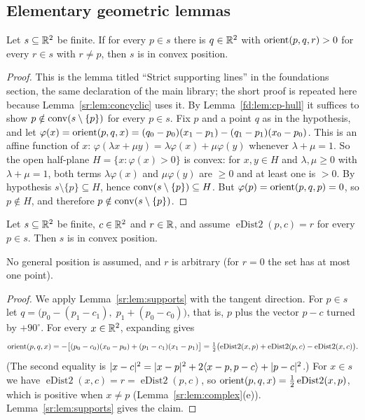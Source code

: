 \subsection{Elementary geometric lemmas}\label{sr:ssec:geom}

\begin{lemma}\label{sr:lem:supports}
Let $s\subseteq\mathbb R^2$ be finite. If for every $p\in s$ there is $q\in\mathbb R^2$ with $\operatorname{orient}(p,q,r)>0$ for every $r\in s$
with $r\ne p$, then $s$ is in convex position.
\end{lemma}

\begin{proof}
This is the lemma titled ``Strict supporting lines'' in the foundations section, the same declaration of the main
library; the short proof is repeated here because Lemma~\ref{sr:lem:concyclic} uses it. By Lemma~\ref{fd:lem:cp-hull} it
suffices to show $p\notin\operatorname{conv}(s\setminus\{p\})$ for every $p\in s$. Fix $p$ and a point $q$ as in the hypothesis, and
let $\varphi(x)=\operatorname{orient}(p,q,x)=(q_0-p_0)(x_1-p_1)-(q_1-p_1)(x_0-p_0)$. This is an affine function of $x$:
$\varphi(\lambda x+\mu y)=\lambda\varphi(x)+\mu\varphi(y)$ whenever $\lambda+\mu=1$. So the open half-plane
$H=\{x:\varphi(x)>0\}$ is convex: for $x,y\in H$ and $\lambda,\mu\ge0$ with $\lambda+\mu=1$, both terms
$\lambda\varphi(x)$ and $\mu\varphi(y)$ are $\ge0$ and at least one is $>0$. By hypothesis $s\setminus\{p\}\subseteq
H$, hence $\operatorname{conv}(s\setminus\{p\})\subseteq H$. But $\varphi(p)=\operatorname{orient}(p,q,p)=0$, so $p\notin H$, and therefore
$p\notin\operatorname{conv}(s\setminus\{p\})$.
\end{proof}

\begin{lemma}\label{sr:lem:concyclic}
Let $s\subseteq\mathbb R^2$ be finite, $c\in\mathbb R^2$ and $r\in\mathbb R$, and assume $\operatorname{eDist2}(p,c)=r$ for every $p\in s$.
Then $s$ is in convex position.
\end{lemma}

No general position is assumed, and $r$ is arbitrary (for $r=0$ the set has at most one point).

\begin{proof}
We apply Lemma~\ref{sr:lem:supports} with the tangent direction. For $p\in s$ let
$q=\bigl(p_0-(p_1-c_1),\;p_1+(p_0-c_0)\bigr)$, that is, $p$ plus the vector $p-c$ turned by $+90^\circ$. For every
$x\in\mathbb R^2$, expanding gives
\[
\operatorname{orient}(p,q,x)=-\bigl[(p_0-c_0)(x_0-p_0)+(p_1-c_1)(x_1-p_1)\bigr]
=\tfrac12\bigl(\operatorname{eDist2}(x,p)+\operatorname{eDist2}(p,c)-\operatorname{eDist2}(x,c)\bigr).
\]
(The second equality is $\lvert x-c\rvert^2=\lvert x-p\rvert^2+2\langle x-p,p-c\rangle+\lvert p-c\rvert^2$.) For $x\in s$ we have
$\operatorname{eDist2}(x,c)=r=\operatorname{eDist2}(p,c)$, so $\operatorname{orient}(p,q,x)=\frac12\operatorname{eDist2}(x,p)$, which is
positive when $x\ne p$ (Lemma~\ref{sr:lem:complex}(e)). Lemma~\ref{sr:lem:supports} gives the claim.
\end{proof}

